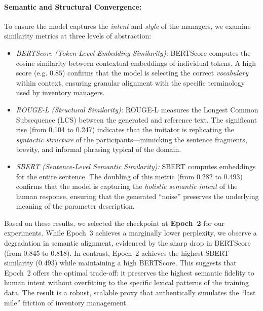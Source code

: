 \paragraph{Semantic and Structural Convergence:}
To ensure the model captures the \emph{intent} and \emph{style} of the managers, we examine similarity metrics at three levels of abstraction:
\begin{itemize}
    \item \emph{BERTScore (Token-Level Embedding Similarity):} BERTScore computes the cosine similarity between contextual embeddings of individual tokens. A high score (e.g. $0.85$) confirms that the model is selecting the correct \emph{vocabulary} within context, ensuring granular alignment with the specific terminology used by inventory managers.
    \item \emph{ROUGE-L (Structural Similarity):} ROUGE-L measures the Longest Common Subsequence (LCS) between the generated and reference text. The significant rise (from 0.104 to 0.247) indicates that the imitator is replicating the \emph{syntactic structure} of the participants—mimicking the sentence fragments, brevity, and informal phrasing typical of the domain.
    \item \emph{SBERT (Sentence-Level Semantic Similarity):} SBERT computes embeddings for the entire sentence. The doubling of this metric (from 0.282 to 0.493) confirms that the model is capturing the \emph{holistic semantic intent} of the human response, ensuring that the generated ``noise'' preserves the underlying meaning of the parameter description.
\end{itemize}

Based on these results, we selected the checkpoint at \textbf{Epoch~2} for our experiments. While Epoch~3 achieves a marginally lower perplexity, we observe a degradation in semantic alignment, evidenced by the sharp drop in BERTScore (from 0.845 to 0.818). In contrast, Epoch~2 achieves the highest SBERT similarity ($0.493$) while maintaining a high BERTScore. This suggests that Epoch~2 offers the optimal trade-off: it preserves the highest semantic fidelity to human intent without overfitting to the specific lexical patterns of the training data. The result is a robust, scalable proxy that authentically simulates the ``last mile'' friction of inventory management.

